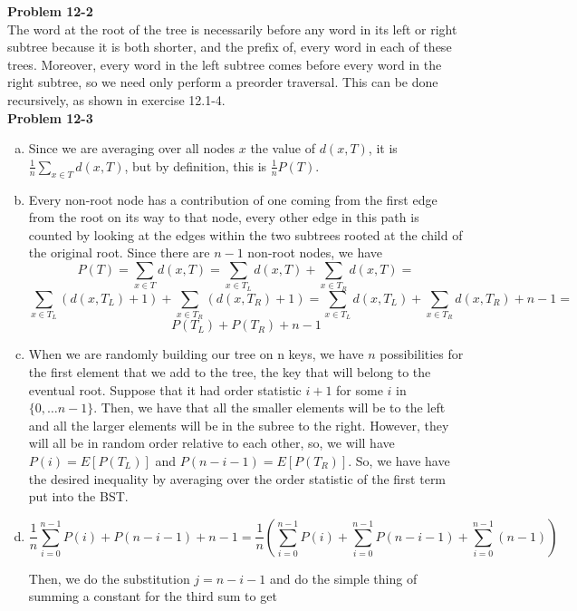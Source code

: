 \documentclass{article}
\begin{document}
\noindent\textbf{Problem 12-2}\\

The word at the root of the tree is necessarily before any word in its left or right subtree because it is both shorter, and the prefix of, every word in each of these trees.  Moreover, every word in the left subtree comes before every word in the right subtree, so we need only perform a preorder traversal.  This can be done recursively, as shown in exercise 12.1-4. \\


\noindent\textbf{Problem 12-3} \\

\begin{enumerate}[a.]
\item
Since we are averaging over all nodes $x$ the value of $d(x,T)$, it is $\frac{1}{n} \sum_{x\in T} d(x,T)$, but by definition, this is $\frac{1}{n} P(T)$.

\item
Every non-root node has a contribution of one coming from the first edge from the root on its way to that node, every other edge in this path is counted by looking at the edges within the two subtrees rooted at the child of the original root. Since there are $n-1$ non-root nodes, we have
\[
P(T) = \sum_{x\in T} d(x,T) = \sum_{x\in T_L} d(x,T) + \sum_{x\in T_R} d(x,T) =\]\[ \sum_{x\in T_L} (d(x,T_L)+1) + \sum_{x\in T_R}(d(x,T_R)+1) = \sum_{x\in T_L}d(x,T_L) + \sum_{x\in T_R}d(x,T_R) + n-1 =\]\[ P(T_L) + P(T_R) +n-1
\]

\item
When we are randomly building our tree on n keys, we have $n$ possibilities for the first element that we add to the tree, the key that will belong to the eventual root. Suppose that it had order statistic $i+1$ for some $i$ in $\{0,\ldots  n-1\}$. Then, we have that all the smaller elements will be to the left and all the larger elements will be in the subree to the right. However, they will all be in random order relative to each other, so, we will have $P(i) = E[P(T_L)]$ and $P(n-i-1) = E[P(T_R)]$. So, we have have the desired inequality by averaging over the order statistic of the first term put into the BST.

\item
\[
\frac{1}{n} \sum_{i=0}^{n-1} P(i) + P(n-i-1) + n-1 = \frac{1}{n}\left(\sum_{i=0}^{n-1}P(i) + \sum_{i=0}^{n-1}P(n-i-1) + \sum_{i=0}^{n-1}(n-1)\right)
\]

Then, we do the substitution $j = n-i-1$ and do the simple thing of summing a constant for the third sum to get


\end{enumerate}
\end{document}
